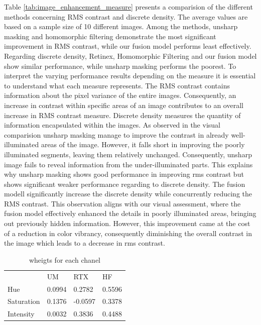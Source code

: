 \documentclass[sigconf]{acmart}
\begin{document}
 
Table \ref{tab:image_enhancement_measure} presents a comparision of the different methods concerning RMS contrast and discrete density. The average values are based on a sample size of 10 different images. Among the methods, unsharp masking and homomorphic filtering demonstrate the most significant improvement in RMS contrast, while our fusion model performs least effectively. Regarding discrete density, Retinex, Homomorphic Filtering and our fusion model show similar performance, while unsharp masking performs the poorest.
To interpret the varying performance results depending on the measure it is essential to understand what each measure represents. The RMS contrast contains information about the pixel variance of the entire images. Consequently, an increase in contrast within specific areas of an image contributes to an overall increase in RMS contrast measure. Discrete density measures the quantity of information encapsulated within the images. As observed in the visual comparision unsharp masking manage to improve the contrast in already well-illuminated areas of the image. However, it falls short in improving the poorly illuminated segments, leaving them relatively unchanged. Consequently, unsharp image fails to reveal information from the under-illuminated parts. This explains why unsharp masking shows good performance in improving rms contrast but shows significant weaker performance regarding to discrete density.
The fusion modell significantly increase the discrete density while concurrently reducing the RMS contrast. This observation aligns with our visual assessment, where the fusion model effectively enhanced the details in poorly illuminated areas, bringing out previously hidden information. However, this improvement came at the cost of a reduction in color vibrancy, consequently diminishing the overall contrast in the image which leads to a decrease in rms contrast.

\begin{table}
	\begin{tabular}{l|lll}
					& UM 	& RTX 		& HF     \\
		Hue 	  	& 0.0994	& 0.2782	& 0.5596  \\
		Saturation 	& 0.1376	& -0.0597	& 0.3378  \\
		Intensity  	& 0.0032	& 0.3836	& 0.4488  \\
		
	\end{tabular}
	\caption{wheigts for each chanel}
	\label{tab:weights}
\end{table}
\end{document}

